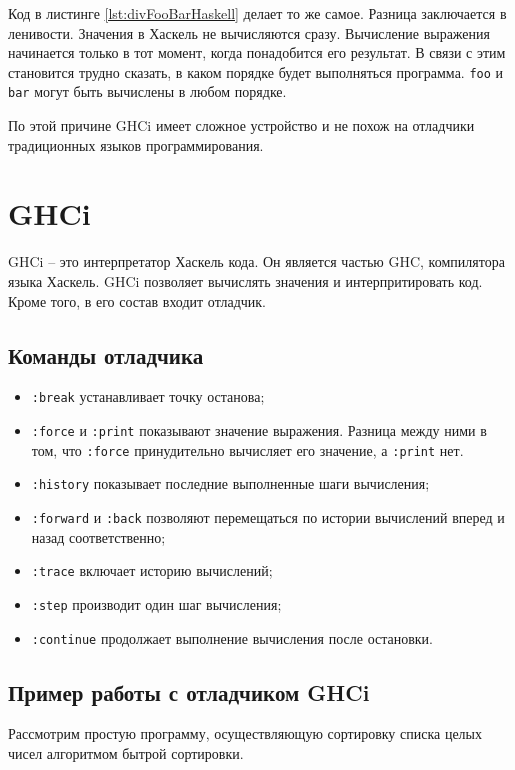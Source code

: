 \documentclass[fontsize=14pt, paper=a4, pagesize, DIV=calc]{scrartcl}
\def\code#1{\texttt{#1}}
\begin{document}
Код в листинге \ref{lst:divFooBarHaskell} делает то же самое. Разница
заключается в ленивости. Значения в Хаскель не вычисляются сразу. Вычисление
выражения начинается только в тот момент, когда понадобится его результат. В
связи с этим становится трудно сказать, в каком порядке будет выполняться
программа. \code{foo} и \code{bar} могут быть вычислены в любом порядке.

По этой причине GHCi имеет сложное устройство и не похож на отладчики
традиционных языков программирования.

\section{GHCi}

GHCi -- это интерпретатор Хаскель кода. Он является частью GHC, компилятора
языка Хаскель. GHCi позволяет вычислять значения и интерпритировать код. Кроме
того, в его состав входит отладчик.

\subsection{Команды отладчика}

\begin{itemize}
\item \code{:break} устанавливает точку останова;
\item \code{:force} и \code{:print} показывают значение выражения. Разница между ними в
том, что \code{:force} принудительно вычисляет его значение, а \code{:print} нет.
\item \code{:history} показывает последние выполненные шаги вычисления;
\item \code{:forward} и \code{:back} позволяют перемещаться по истории
вычислений вперед и назад соответственно;
\item \code{:trace} включает историю вычислений;
\item \code{:step} производит один шаг вычисления;
\item \code{:continue} продолжает выполнение вычисления после остановки.
\end{itemize}

\subsection{Пример работы с отладчиком GHCi}

Рассмотрим простую программу, осуществляющую сортировку списка целых чисел
алгоритмом бытрой сортировки.
\end{document}
